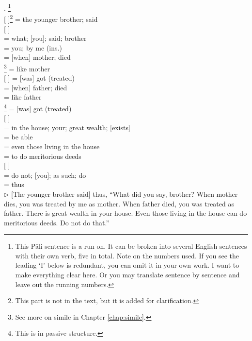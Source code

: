 \medskip
{}. \footnote{This P\=ali sentence is a run-on. It can be broken into several English sentences with their own verb, five in total. Note on the numbers used. If you see the leading `I' below is redundant, you can omit it in your own work. I want to make everything clear here. Or you may translate sentence by sentence and leave out the running numbers.}\\[1mm]
\small
[   ]\footnote{This part is not in the text, but it is added for clarification.} = the younger brother; said\\[0.5mm]
 [  ]  \\[0.5mm]
= what; [you]; said; brother\\[0.5mm]
  = you; by me (ins.)\\[0.5mm]
 = [when] mother; died\\[0.5mm]
\footnote{See more on simile in Chapter \ref{chap:simile}.} = like mother\\[0.5mm]
[  ] = [was] got (treated)\\[0.5mm]
 = [when] father; died\\[0.5mm]
 = like father\\[0.5mm]
\footnote{This is in passive structure.} = [was] got (treated)\\[0.5mm]
   [  ]\\[0.5mm]
= in the house; your; great wealth; [exists]\\[0.5mm]
 = be able\\[0.5mm]
 = even those living in the house\\[0.5mm]
 = to do meritorious deeds\\[0.5mm]
 [  ]  \\[0.5mm]
= do not; [you]; as such; do\\[0.5mm]
 = thus\\[1mm]
\normalsize
$\triangleright$ [The younger brother said] thus, ``What did you say, brother? When mother dies, you was treated by me as mother. When father died, you was treated as father. There is great wealth in your house. Even those living in the house can do meritorious deeds. Do not do that.''\\[1.5mm]

